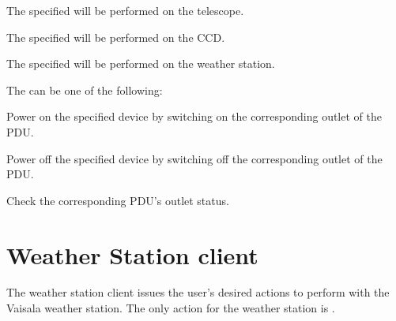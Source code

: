 \documentclass[a4paper,english]{article}
\begin{document}
\begin{Description}\setlength{\itemsep}{0cm}
\item[\Arg{telescope}] The specified  will be performed on the telescope.

	    

\item[\Arg{ccd}] The specified  will be performed on the CCD.

	    

\item[\Arg{weather\_station}] The specified  will be performed on the weather station.

	    

\end{Description}

The  can be one of the following:

\begin{Description}\setlength{\itemsep}{0cm}
\item[\Arg{power\_on}] Power on the specified device by switching on the corresponding outlet of the PDU.

	    

\item[\Arg{power\_off}] Power off the specified device by switching off the corresponding outlet of the PDU.

	    

\item[\Arg{power\_status}] Check the corresponding PDU's outlet status.

	    

\end{Description}

\section{Weather Station client}

The weather station client issues the user's desired actions to perform with the Vaisala weather station. The only action for the weather station is . \\
\end{document}
